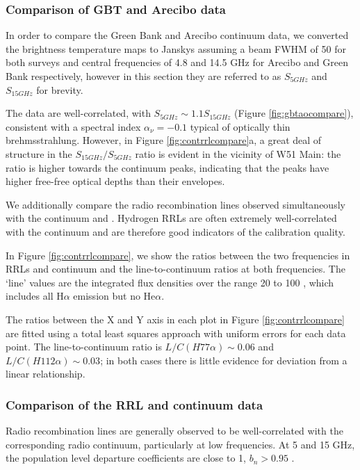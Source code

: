 \subsubsection{Comparison of GBT and Arecibo data}
In order to compare the Green Bank and Arecibo continuum data, we converted
the brightness temperature maps to Janskys assuming a beam FWHM of 50\arcsec
for both surveys and central frequencies of 4.8 and 14.5 GHz for Arecibo and
Green Bank respectively, however in this section they are referred to as $S_{5
GHz}$ and $S_{15 GHz}$ for brevity.

The data are well-correlated, with $S_{5 GHz} \sim 1.1 S_{15 GHz}$ (Figure
\ref{fig:gbtaocompare}), consistent with a spectral index $\alpha_\nu=-0.1$
typical of optically thin brehmsstrahlung.
However, in Figure \ref{fig:contrrlcompare}a, a great deal of structure in the
$S_{15 GHz}/S_{5 GHz}$ ratio is evident in the vicinity of W51 Main: the ratio
is higher towards the continuum peaks, indicating that the peaks have higher
free-free optical depths than their envelopes.

We additionally compare the radio recombination lines observed simultaneously
with the continuum and \formaldehyde.  Hydrogen RRLs are often extremely
well-correlated with the continuum and are therefore good indicators of the
calibration quality.

In Figure \ref{fig:contrrlcompare}, we show the ratios between the two
frequencies in RRLs and continuum and the line-to-continuum ratios at both
frequencies.  The `line' values are the integrated flux densities over the
range 20 to 100 \kms, which includes all H$\alpha$ emission but no He$\alpha$.

The ratios between the X and Y axis in each plot in Figure
\ref{fig:contrrlcompare} are fitted using a total least squares approach with
uniform errors for each data point.   The line-to-continuum ratio is
$L/C(H77\alpha)\sim0.06$ and $L/C(H112\alpha)\sim0.03$; in both cases there is
little evidence for deviation from a linear relationship.

\subsubsection{Comparison of the RRL and continuum data}
Radio recombination lines are generally observed to be well-correlated with the
corresponding radio continuum, particularly at low frequencies.  At 5 and 15
GHz, the population level departure coefficients are close to 1, $b_n > 0.95$
\citep{Wilson2009a,Walmsley1990a}.

